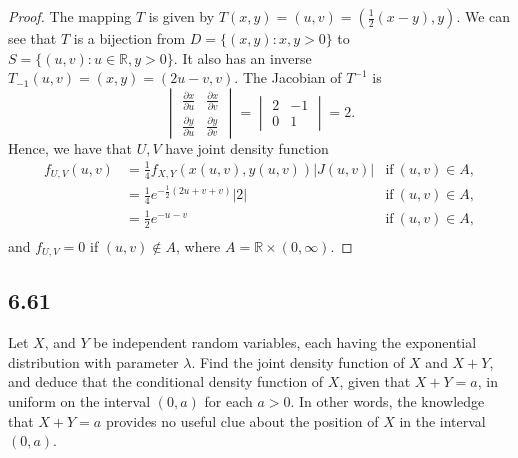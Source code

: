 \documentclass{article}
\newcommand{\R}{\mathbb{R}}
\newcommand{\partiald}[2]{\frac{\partial #1}{\partial #2}}
\begin{document}
\begin{proof}
    The mapping $T$ is given by $T(x,y) = (u,v) = (\frac{1}{2}(x-y), y)$. We can
    see that $T$ is a bijection from $D=\{(x,y): x,y > 0\}$ to
    ${S = \{(u,v): u \in \R, y>0\}}$. It also has an inverse
    $T_{-1}(u,v) = (x,y) = (2u-v, v)$. The Jacobian of $T^{-1}$ is
    \begin{equation*}
        \begin{vmatrix}
            \partiald{x}{u} & \partiald{x}{v} \\
            \partiald{y}{u} & \partiald{y}{v}
        \end{vmatrix} =
        \begin{vmatrix}
            2 & -1 \\
            0 & 1
        \end{vmatrix} = 2.
    \end{equation*}
    Hence, we have that $U,V$ have joint density function
    \begin{align*}
        f_{U,V}(u,v) & = \frac{1}{4}f_{X,Y}(x(u,v),y(u,v))|J(u,v)|
                     & \text{if} \ (u,v) \in A,                    \\
                     & = \frac{1}{4}e^{-\frac{1}{2}(2u+v+v)}|2|
                     & \text{if} \ (u,v) \in A,                    \\
                     & = \frac{1}{2}e^{-u-v}
                     & \text{if} \ (u,v) \in A,                    \\
    \end{align*}
    and $f_{U,V} = 0$ if $(u,v) \not \in A$, where $A = \R \times (0,\infty)$.
\end{proof}

\subsection*{6.61}
Let $X$, and $Y$ be independent random variables, each having the exponential
distribution with parameter $\lambda$. Find the joint density function of
$X$ and $X+Y$, and deduce that the conditional density function of $X$,
given that $X+Y=a$, in uniform on the interval $(0,a)$ for each $a>0$.
In other words, the knowledge that $X+Y = a$ provides no useful clue
about the position of $X$ in the interval $(0,a)$.
\end{document}
